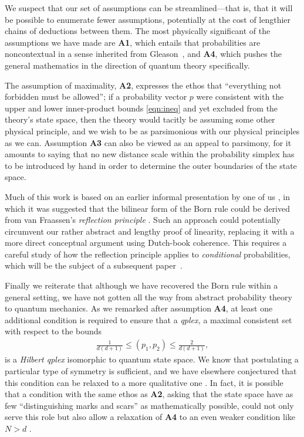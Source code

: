 \documentclass[%
 reprint,superscriptaddress,
 amsmath,amssymb,
 aps,twocolumn,pra
]{revtex4-1}
\newcommand{\eqn}[1]{\begin{eqnarray} #1 \end{eqnarray}}
\begin{document}
We suspect that our set of assumptions can be streamlined---that is, that it will be possible to enumerate fewer assumptions, potentially at the cost of lengthier chains of deductions between them. The most physically significant of the assumptions we have made are {\bf A1}, which entails that probabilities are noncontextual in a sense inherited from Gleason~\cite{BUSCH, RENES}, and {\bf A4}, which pushes the general mathematics in the direction of quantum theory specifically.

The assumption of maximality, {\bf A2}, expresses the ethos that ``everything not forbidden must be allowed''; if a probability vector $p$ were consistent with the upper and lower inner-product bounds \eqref{eqn:ineq} and yet excluded from the theory's state space, then the theory would tacitly be assuming some other physical principle, and we wish to be as parsimonious with our physical principles as we can. Assumption {\bf A3} can also be viewed as an appeal to parsimony, for it amounts to saying that no new distance scale within the probability simplex has to be introduced by hand in order to determine the outer boundaries of the state space.

Much of this work is based on an earlier informal presentation by one of us \cite{VITALITY}, in which it was suggested that the bilinear form of the Born rule could be derived from van Fraassen's  \emph{reflection principle} \cite{VANF, FS_reflection}. Such an approach could potentially circumvent our rather abstract and lengthy proof of linearity, replacing it with a more direct conceptual argument using Dutch-book coherence. This requires a careful study of how the reflection principle applies to \emph{conditional} probabilities, which will be the subject of a subsequent paper~\cite{FutureWork}.

Finally we reiterate that although we have recovered the Born rule within a general setting, we have not gotten all the way from abstract probability theory to quantum mechanics. As we remarked after assumption {\bf A4}, at least one additional condition is required to ensure that a \emph{qplex,} a maximal consistent set with respect to the bounds
\eqn{
\frac{1}{d(d+1)} \leq (p_1,p_2) \leq \frac{2}{d(d+1)}, \nonumber
}
is a \emph{Hilbert qplex} isomorphic to quantum state space. We know that postulating a particular type of symmetry is sufficient, and we have elsewhere conjectured that this condition can be relaxed to a more qualitative one \cite{QPLEX}. In fact, it is possible that a condition with the same ethos as {\bf A2}, asking that the state space have as few ``distinguishing marks and scars'' as mathematically possible, could not only serve this role but also allow a relaxation of {\bf A4} to an even weaker condition like $N > d$ \cite{VITALITY}.
\end{document}
